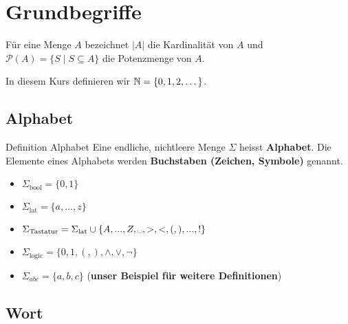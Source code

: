 \section{Grundbegriffe} %


	Für eine Menge $A$ bezeichnet $|A|$ die Kardinalität von $A$ und $\mathcal{P}(A) = \{S \mid S \subseteq A\}$ die Potenzmenge von $A$.
		
	 In diesem Kurs definieren wir $\mathbb{N} = \{0,1,2, \dots\}$.


\subsection{Alphabet}


		
	 \begin{mainbox}{Definition Alphabet}
		Eine endliche, nichtleere Menge $\Sigma$ heisst \textbf{Alphabet}. Die Elemente eines Alphabets werden \textbf{Buchstaben (Zeichen, Symbole)} genannt.
	 \end{mainbox}
	 
	 \begin{itemize}
		\item $\Sigma_{\text{bool}} = \{0,1\}$
		\item $\Sigma_{\text{lat}} = \{a, ..., z\}$
		\item $\Sigma_{\text{Tastatur}} = \Sigma_{\text{lat}} \cup \{A, ..., Z, \text{\textvisiblespace}, >, <, (,),...,! \}$
		\item $\Sigma_{\text{logic}} = \{0,1,(,),\land, \lor, \lnot\}$
		\item $\Sigma_{abc} = \{a,b,c\}$ (\textbf{unser Beispiel für weitere Definitionen})
	 \end{itemize}



\subsection{Wort}


